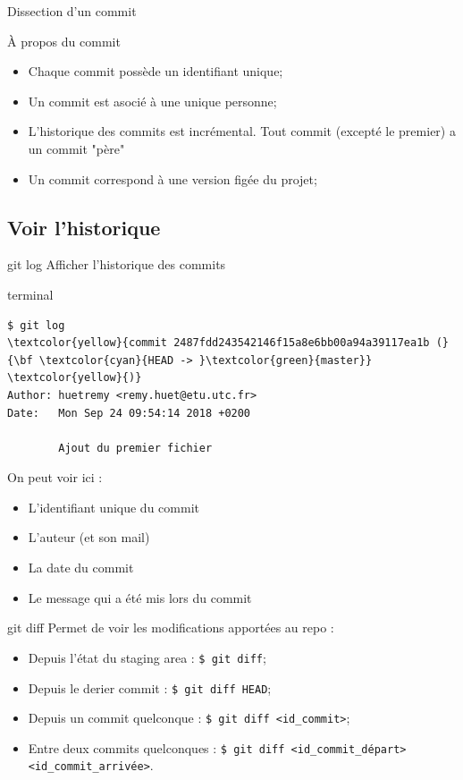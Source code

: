 \documentclass[usepdftitle=false]{beamer}
\def\seplength{.5\topsep}
\newcommand{\Pause}{%
\ifdef{\Release}
  {\pause}
  {}
}
\begin{document}
\begin{frame}{Dissection d'un commit}
	\begin{block}{À propos du commit}
		\begin{itemize}
			\item Chaque commit possède un identifiant unique;
			\item Un commit est asocié à une unique personne;
			\item L'historique des commits est incrémental. Tout commit (excepté le premier) a un commit "père"
			\item Un commit correspond à une version figée du projet;
		\end{itemize}
	\end{block}
\end{frame}

\subsection{Voir l'historique}

\begin{frame}[fragile]{git log}
	Afficher l'historique des commits
	\begin{beamercolorbox}[rounded=true,shadow=true]{terminal}
		\vspace{-\seplength}
		\begin{Verbatim}
$ git log
\textcolor{yellow}{commit 2487fdd243542146f15a8e6bb00a94a39117ea1b (}{\bf \textcolor{cyan}{HEAD -> }\textcolor{green}{master}} \textcolor{yellow}{)}
Author: huetremy <remy.huet@etu.utc.fr>
Date:   Mon Sep 24 09:54:14 2018 +0200

    	Ajout du premier fichier
		\end{Verbatim}
	\end{beamercolorbox}
	\Pause
	On peut voir ici : \Pause
	\begin{itemize}
		\item L'identifiant unique du commit \Pause
		\item L'auteur (et son mail) \Pause
		\item La date du commit \Pause
		\item Le message qui a été mis lors du commit
	\end{itemize}
\end{frame}

\begin{frame}[fragile]{git diff}
	Permet de voir les modifications apportées au repo :
	\begin{itemize}
		\item Depuis l'état du staging area : \verb+$ git diff+;
		\item Depuis le derier commit : \verb+$ git diff HEAD+;
		\item Depuis un commit quelconque : \verb+$ git diff <id_commit>+;
		\item Entre deux commits quelconques : \verb+$ git diff <id_commit_départ> <id_commit_arrivée>+.
	\end{itemize}
\end{frame}
\end{document}
